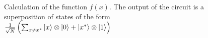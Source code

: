\begin{figure}
\centering



\caption{Calculation of the function $f\left(x\right)$. The output of the circuit is
  a superposition of states of the form 
$\frac{1}{\sqrt{N}}\left(
 \sum_{x \ne x^{\ast}} \ket{x}\otimes\ket{0}
+ \left|x^{\ast}\right>\otimes\ket{1}
\right)$}
\label{figQuantCompGrover1}
\end{figure}